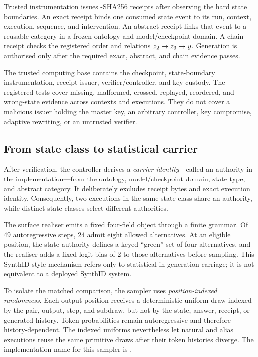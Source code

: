 Trusted instrumentation issues \hmac-SHA256 receipts after observing the hard
state boundaries. An exact receipt binds one consumed state event to its run,
context, execution, sequence, and intervention. An abstract receipt links that
event to a reusable category in a frozen ontology and model/checkpoint domain.
A chain receipt checks the registered order and relations
$z_2\rightarrow z_3\rightarrow y$. Generation is authorised only after
the required exact, abstract, and chain evidence passes.



The trusted computing base contains the checkpoint, state-boundary
instrumentation, receipt issuer, verifier/controller, and key custody. The
registered tests cover missing, malformed, crossed, replayed, reordered, and
wrong-state evidence across contexts and executions. They do not cover a
malicious issuer holding the master key, an arbitrary controller, key
compromise, adaptive rewriting, or an untrusted verifier.

\subsection{From state class to statistical carrier}

After verification, the controller derives a \emph{carrier identity}---called
an authority in the implementation---from the ontology, model/checkpoint
domain, state type, and abstract category. It deliberately excludes receipt
bytes and exact execution identity. Consequently, two executions in the same
state class share an authority, while distinct state classes select different
authorities.

The surface realiser emits a fixed four-field object through a finite grammar.
Of 49 autoregressive steps, 24 admit eight allowed alternatives. At an eligible
position, the state authority defines a keyed ``green'' set of four
alternatives, and the realiser adds a fixed logit bias of 2 to those
alternatives before sampling. This SynthID-style mechanism refers only to
statistical in-generation carriage; it is not equivalent to a deployed
SynthID system.

To isolate the matched comparison, the sampler uses
\emph{position-indexed randomness}. Each output position receives a
deterministic uniform draw indexed by the pair, output, step, and subdraw, but
not by the state, answer, receipt, or generated history. Token probabilities
remain autoregressive and therefore history-dependent. The indexed uniforms
nevertheless let natural and alias executions reuse the same primitive draws
after their token histories diverge. The implementation name for this sampler
is \rngtwo{}.

